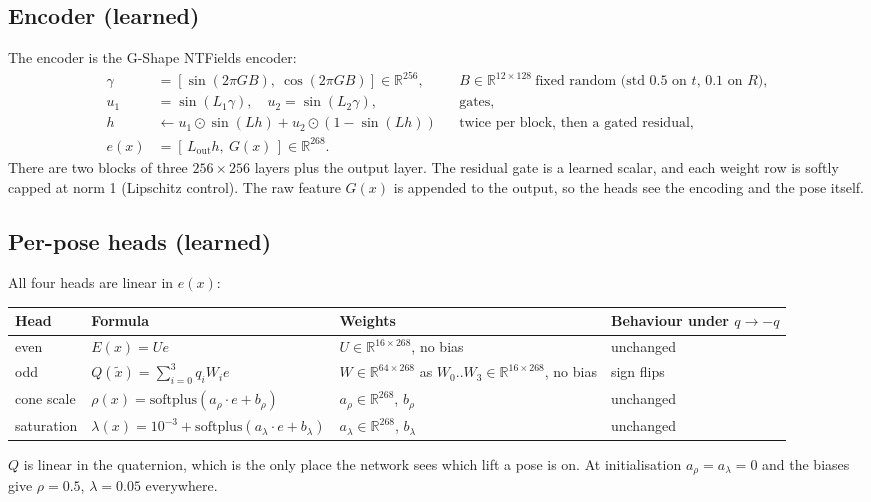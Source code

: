 \documentclass[10pt]{article}
\newcommand{\xt}{\tilde x}
\begin{document}
\subsection{Encoder (learned)}
The encoder is the G-Shape NTFields encoder:
\begin{align*}
  \gamma &= [\sin(2\pi G B),\ \cos(2\pi G B)]\in\mathbb{R}^{256}, && B\in\mathbb{R}^{12\times128}\ \text{fixed random
  (std 0.5 on $t$, 0.1 on $R$)},\\
  u_1 &= \sin(L_1\gamma),\quad u_2=\sin(L_2\gamma), && \text{gates,}\\
  h &\leftarrow u_1\odot\sin(Lh)+u_2\odot(1-\sin(Lh)) && \text{twice per block, then a gated residual},\\
  e(x) &= [\,L_{\mathrm{out}}h,\ G(x)\,]\in\mathbb{R}^{268}. &&
\end{align*}
There are two blocks of three $256\times256$ layers plus the output layer. The residual gate is a learned scalar,
and each weight row is softly capped at norm 1 (Lipschitz control). The raw feature $G(x)$ is appended to the output,
so the heads see the encoding and the pose itself.

\subsection{Per-pose heads (learned)}
All four heads are linear in $e(x)$:
\begin{center}\small
\begin{tabular}{llll}
\toprule
Head & Formula & Weights & Behaviour under $q\to-q$ \\
\midrule
even & $E(x)=U e$ & $U\in\mathbb{R}^{16\times268}$, no bias & unchanged \\
odd & $Q(\xt)=\sum_{i=0}^{3}q_iW_ie$ & $W\in\mathbb{R}^{64\times268}$ as $W_0..W_3\in\mathbb{R}^{16\times268}$, no bias & sign flips \\
cone scale & $\rho(x)=\mathrm{softplus}(a_\rho\!\cdot e+b_\rho)$ & $a_\rho\in\mathbb{R}^{268}$, $b_\rho$ & unchanged \\
saturation & $\lambda(x)=10^{-3}+\mathrm{softplus}(a_\lambda\!\cdot e+b_\lambda)$ & $a_\lambda\in\mathbb{R}^{268}$, $b_\lambda$ & unchanged \\
\bottomrule
\end{tabular}
\end{center}
$Q$ is linear in the quaternion, which is the only place the network sees which lift a pose is on. At initialisation
$a_\rho=a_\lambda=0$ and the biases give $\rho=0.5$, $\lambda=0.05$ everywhere.
\end{document}
